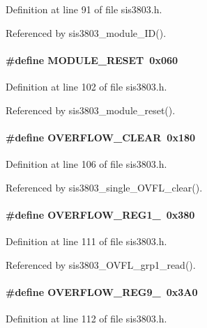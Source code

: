 Definition at line 91 of file sis3803.h.

Referenced by sis3803\_\-module\_\-ID().
\paragraph[{MODULE\_\-RESET}]{\setlength{\rightskip}{0pt plus 5cm}\#define MODULE\_\-RESET~0x060}\hfill\label{sis3803_8h_a95c86096655aef583e46eccd5c229176}


Definition at line 102 of file sis3803.h.

Referenced by sis3803\_\-module\_\-reset().
\paragraph[{OVERFLOW\_\-CLEAR}]{\setlength{\rightskip}{0pt plus 5cm}\#define OVERFLOW\_\-CLEAR~0x180}\hfill\label{sis3803_8h_ad7a3a151a6daafcbec29eef54aa259b2}


Definition at line 106 of file sis3803.h.

Referenced by sis3803\_\-single\_\-OVFL\_\-clear().
\paragraph[{OVERFLOW\_\-REG1\_\-8}]{\setlength{\rightskip}{0pt plus 5cm}\#define OVERFLOW\_\-REG1\_~0x380}\hfill\label{sis3803_8h_a9dc1391b74f4ba8289eec7d759cf42c6}


Definition at line 111 of file sis3803.h.

Referenced by sis3803\_\-OVFL\_\-grp1\_\-read().
\paragraph[{OVERFLOW\_\-REG9\_\-16}]{\setlength{\rightskip}{0pt plus 5cm}\#define OVERFLOW\_\-REG9\_~0x3A0}\hfill\label{sis3803_8h_a8fe65015140f30da1badc618cc163d18}


Definition at line 112 of file sis3803.h.

